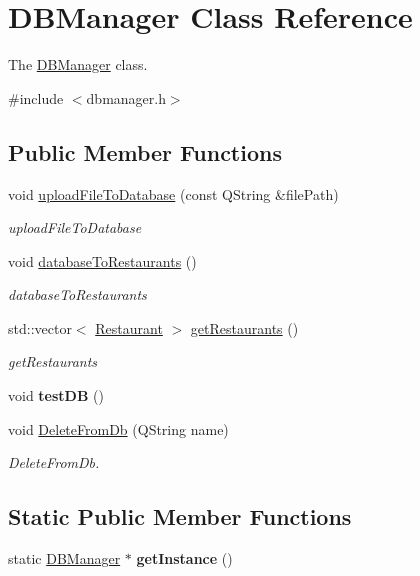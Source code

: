 \hypertarget{class_d_b_manager}{}\section{D\+B\+Manager Class Reference}
\label{class_d_b_manager}


The \hyperlink{class_d_b_manager}{D\+B\+Manager} class.  




{\ttfamily \#include $<$dbmanager.\+h$>$}

\subsection*{Public Member Functions}
\begin{DoxyCompactItemize}
\item 
void \hyperlink{class_d_b_manager_a2d29cb558fdbf54d17b180088bd8651e}{upload\+File\+To\+Database} (const Q\+String \&file\+Path)
\begin{DoxyCompactList}\small\item\em upload\+File\+To\+Database \end{DoxyCompactList}\item 
void \hyperlink{class_d_b_manager_a914d5a2d66ddff2b0a39c545966540e9}{database\+To\+Restaurants} ()
\begin{DoxyCompactList}\small\item\em database\+To\+Restaurants \end{DoxyCompactList}\item 
std\+::vector$<$ \hyperlink{class_restaurant}{Restaurant} $>$ \hyperlink{class_d_b_manager_ab726a1be7b797085723623f5497946e6}{get\+Restaurants} ()
\begin{DoxyCompactList}\small\item\em get\+Restaurants \end{DoxyCompactList}\item 
\mbox{\label{class_d_b_manager_aa90cd2919d5e288ec5656e4d0abfdbe4}} 
void {\bfseries test\+DB} ()
\item 
void \hyperlink{class_d_b_manager_ac2f9bedac3778197de1301775ef8d42f}{Delete\+From\+Db} (Q\+String name)
\begin{DoxyCompactList}\small\item\em Delete\+From\+Db. \end{DoxyCompactList}\end{DoxyCompactItemize}
\subsection*{Static Public Member Functions}
\begin{DoxyCompactItemize}
\item 
\mbox{\label{class_d_b_manager_ad386a91c5c54a9e34e793b35ec0957c8}} 
static \hyperlink{class_d_b_manager}{D\+B\+Manager} $\ast$ {\bfseries get\+Instance} ()
\end{DoxyCompactItemize}


